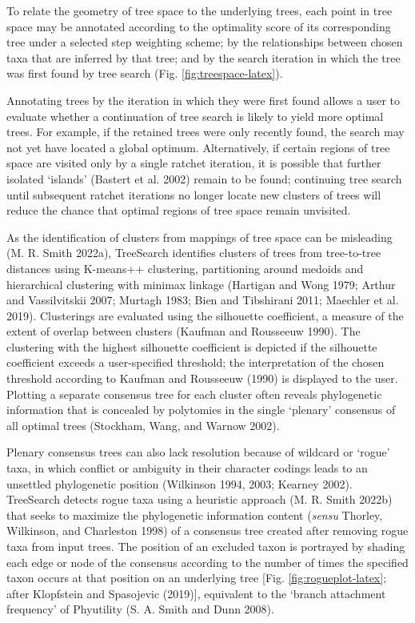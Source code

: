 To relate the geometry of tree space to the underlying trees, each point in tree
space may be annotated according to the optimality score of its corresponding
tree under a selected step weighting scheme; by the relationships between chosen
taxa that are inferred by that tree; and by the search iteration in which the
tree was first found by tree search (Fig. \ref{fig:treespace-latex}).

Annotating trees by the iteration in which they were first found allows a user
to evaluate whether a continuation of tree search is likely to yield more
optimal trees. For example, if the retained trees were only recently found, the
search may not yet have located a global optimum. Alternatively, if certain
regions of tree space are visited only by a single ratchet iteration, it is
possible that further isolated `islands' (Bastert et al. 2002) remain to be found;
continuing tree search until subsequent ratchet iterations no longer locate new
clusters of trees will reduce the chance that optimal regions of tree space
remain unvisited.

As the identification of clusters from mappings of tree space can be misleading
(M. R. Smith 2022a), TreeSearch identifies clusters of trees from tree-to-tree
distances using K-means++ clustering, partitioning around medoids and
hierarchical clustering with minimax linkage (Hartigan and Wong 1979; Arthur and Vassilvitskii 2007; Murtagh 1983; Bien and Tibshirani 2011; Maechler et al. 2019). Clusterings are evaluated using the
silhouette coefficient, a measure of the extent of overlap between clusters
(Kaufman and Rousseeuw 1990). The clustering with the highest silhouette coefficient is
depicted if the silhouette coefficient exceeds a user-specified threshold; the
interpretation of the chosen threshold according to Kaufman and Rousseeuw (1990) is displayed to
the user. Plotting a separate consensus tree for each cluster often reveals
phylogenetic information that is concealed by polytomies in the single `plenary'
consensus of all optimal trees (Stockham, Wang, and Warnow 2002).

Plenary consensus trees can also lack resolution because of wildcard or `rogue'
taxa, in which conflict or ambiguity in their character codings leads to an
unsettled phylogenetic position (Wilkinson 1994, 2003; Kearney 2002).
TreeSearch detects rogue taxa using a heuristic approach (M. R. Smith 2022b) that
seeks to maximize the phylogenetic information content (\emph{sensu} Thorley, Wilkinson, and Charleston 1998) of
a consensus tree created after removing rogue taxa from input trees. The
position of an excluded taxon is portrayed by shading each edge or node of the
consensus according to the number of times the specified taxon occurs at that
position on an underlying tree
{[}Fig. \ref{fig:rogueplot-latex}; after
Klopfstein and Spasojevic (2019){]}, equivalent to the `branch attachment frequency' of Phyutility
(S. A. Smith and Dunn 2008).

